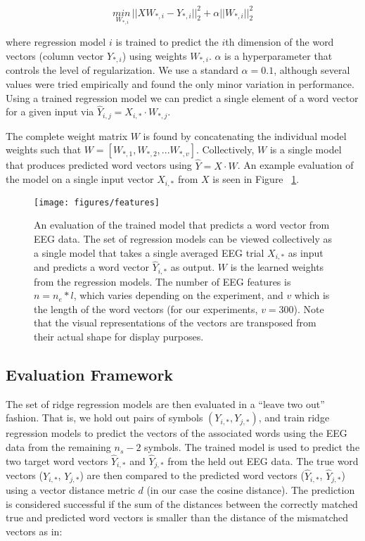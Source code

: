\begin{equation}
  \underset{W_{*,i}}{min\,} {|| X W_{*, i} - Y_{*, i}||_2^2 + \alpha ||W_{*, i}||_2^2}
  \label{eq:ridge}
\end{equation}

\noindent where regression model $i$ is trained to predict the $i$th dimension of the word vectors (column vector $Y_{*,i}$) using weights $W_{*,i}$. $\alpha$ is a hyperparameter that controls the level of regularization. We use a standard $\alpha = 0.1$, although several values were tried empirically and found the only minor variation in performance. Using a trained regression model we can predict a single element of a word vector for a given input via $\hat{Y}_{i,j} = X_{i, *} \cdot W_{*,j}$.

The complete weight matrix $W$ is found by concatenating the individual model weights such that $W = [ W_{*,1}, W_{*,2}, ... W_{*,v} ]$. Collectively, $W$ is a single model that produces predicted word vectors using $\hat{Y} = X \cdot W$. An example evaluation of the model on a single input vector $X_{i,*}$ from $X$ is seen in Figure ~\ref{fig:features}.

\begin{figure}[t]
  \centering
  \texttt{[image: figures/features]}
  \caption{An evaluation of the trained model that predicts a word vector from EEG data. The set of regression models can be viewed collectively as a single model that takes a single averaged EEG trial $X_{i,*}$ as input and predicts a word vector $\hat{Y}_{i,*}$ as output. $W$ is the learned weights from the regression models. The number of EEG features is $n = n_e * l$, which varies depending on the experiment, and $v$ which is the length of the word vectors (for our experiments, $v=300$). Note that the visual representations of the vectors are transposed from their actual shape for display purposes.}
  \label{fig:features}
\end{figure}

\subsection{Evaluation Framework}
The set of ridge regression models are then evaluated in a ``leave two out'' fashion. That is, we hold out pairs of symbols $(Y_{i,*}, Y_{j,*})$, and train ridge regression models to predict the vectors of the associated words using the EEG data from the remaining $n_s-2$ symbols.  The trained model is used to predict the two target word vectors $\hat{Y}_{i,*}$ and $\hat{Y}_{j,*}$ from the held out EEG data. The true word vectors ($Y_{i,*}$, $Y_{j,*}$) are then compared to the predicted word vectors ($\hat{Y}_{i,*}$, $\hat{Y}_{j,*}$) using a vector distance metric $d$ (in our case the cosine distance). The prediction is considered successful if the sum of the distances between the correctly matched true and predicted word vectors is smaller than the distance of the mismatched vectors as in: 
  
